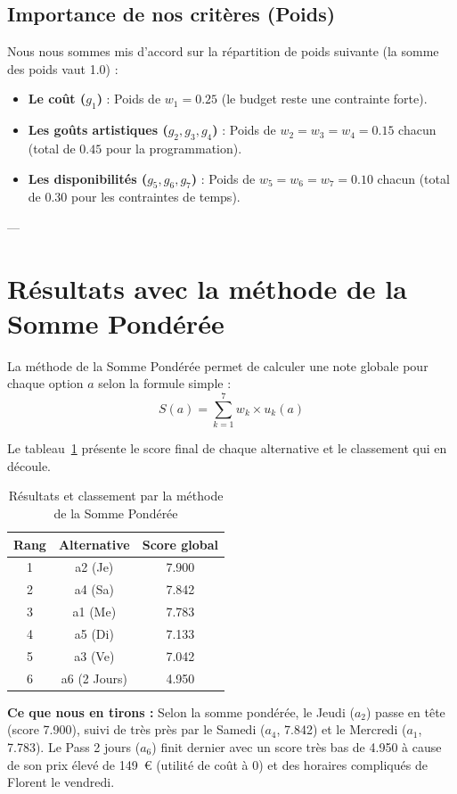 \documentclass[11pt,a4paper]{article}
\begin{document}
\subsection{Importance de nos critères (Poids)}
Nous nous sommes mis d'accord sur la répartition de poids suivante (la somme des poids vaut 1.0) :
\begin{itemize}
    \item \textbf{Le coût ($g_1$)} : Poids de $w_1 = 0.25$ (le budget reste une contrainte forte).
    \item \textbf{Les goûts artistiques ($g_2, g_3, g_4$)} : Poids de $w_2 = w_3 = w_4 = 0.15$ chacun (total de $0.45$ pour la programmation).
    \item \textbf{Les disponibilités ($g_5, g_6, g_7$)} : Poids de $w_5 = w_6 = w_7 = 0.10$ chacun (total de $0.30$ pour les contraintes de temps).
\end{itemize}

---

\section{Résultats avec la méthode de la Somme Pondérée}
\label{sec:somme_ponderee}

La méthode de la Somme Pondérée permet de calculer une note globale pour chaque option $a$ selon la formule simple :
$$S(a) = \sum_{k=1}^{7} w_k \times u_k(a)$$

Le tableau~\ref{tab:ranking_ws} présente le score final de chaque alternative et le classement qui en découle.

\begin{table}[H]
  \centering
  \caption{Résultats et classement par la méthode de la Somme Pondérée}
  \label{tab:ranking_ws}
  \begin{tabular}{ccc}
    \toprule
    Rang & Alternative & Score global \\
    \midrule
    1 & a2 (Je) & 7.900 \\
    2 & a4 (Sa) & 7.842 \\
    3 & a1 (Me) & 7.783 \\
    4 & a5 (Di) & 7.133 \\
    5 & a3 (Ve) & 7.042 \\
    6 & a6 (2 Jours) & 4.950 \\
    \bottomrule
  \end{tabular}
\end{table}

\textbf{Ce que nous en tirons :}
Selon la somme pondérée, le Jeudi ($a_2$) passe en tête (score 7.900), suivi de très près par le Samedi ($a_4$, 7.842) et le Mercredi ($a_1$, 7.783). Le Pass 2 jours ($a_6$) finit dernier avec un score très bas de 4.950 à cause de son prix élevé de 149~€ (utilité de coût à 0) et des horaires compliqués de Florent le vendredi.
\end{document}
